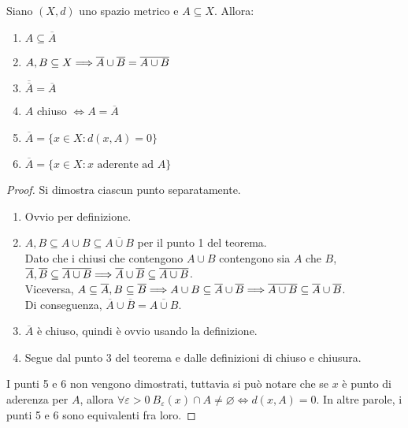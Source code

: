 \begin{theorem}
    \label{thm:chiusura}
    Siano $(X,d)$ uno spazio metrico e $A \subseteq X$. Allora:
    \begin{enumerate}
        \item $A \subseteq \overline A$
        \item $A, B \subseteq X \Longrightarrow \overline{A} \cup \overline{B} = \overline{A \cup B}$
        \item $\overline{\overline{A}} = \overline{A}$
        \item $A$ chiuso $\iff A = \overline{A}$
        \item $\overline{A} = \{x\in X : d(x,A) = 0\}$
        \item $\overline{A} = \{x \in X : x\text{ aderente ad }A\}$
    \end{enumerate}
\end{theorem}

\begin{proof} Si dimostra ciascun punto separatamente.
    \begin{enumerate}
        \item Ovvio per definizione.
        \item $A, B \subseteq A \cup B \subseteq \overline{A \cup B}$ per il punto 1 del teorema.\\
        Dato che i chiusi che contengono $A \cup B$ contengono sia $A$ che $B$, $\overline A, \overline B \subseteq \overline{A \cup B} \Longrightarrow \overline A \cup \overline B \subseteq \overline{A \cup B}$.\\
        Viceversa, $A \subseteq \overline{A}, B \subseteq \overline{B} \Longrightarrow A \cup B \subseteq \overline{A} \cup \overline{B} \Longrightarrow \overline{A \cup B} \subseteq \overline{A} \cup \overline{B}$.\\
        Di conseguenza, $\overline{A} \cup \overline{B} = \overline{A \cup B}$.
        \item $\overline{A}$ è chiuso, quindi è ovvio usando la definizione.
        \item Segue dal punto 3 del teorema e dalle definizioni di chiuso e chiusura.
    \end{enumerate}
    I punti 5 e 6 non vengono dimostrati, tuttavia si può notare che se $x$ è punto di aderenza per $A$, allora $\forall \varepsilon > 0 \ B_\varepsilon(x) \cap A \neq \varnothing \iff d(x,A)=0$. In altre parole, i punti 5 e 6 sono equivalenti fra loro.
\end{proof}

